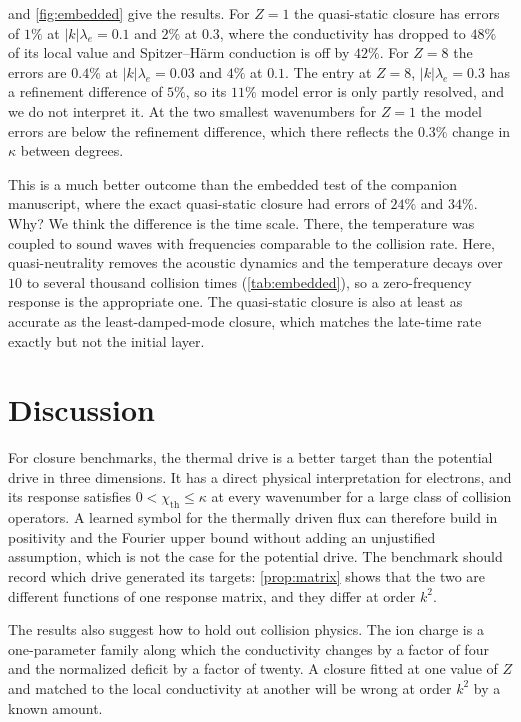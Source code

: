 \documentclass[11pt]{article}
\newcommand{\kap}{\kappa}
\newcommand{\thr}{\mathrm{th}}
\theoremstyle{definition}
\theoremstyle{remark}
\numberwithin{equation}{section}
\begin{document}
 and \cref{fig:embedded} give the results. For $Z=1$
the quasi-static closure has errors of $1\%$ at $|k|\lambda_e=0.1$ and
$2\%$ at $0.3$, where the conductivity has dropped to $48\%$ of its local
value and Spitzer--H\"arm conduction is off by $42\%$. For $Z=8$ the
errors are $0.4\%$ at $|k|\lambda_e=0.03$ and $4\%$ at $0.1$. The entry
at $Z=8$, $|k|\lambda_e=0.3$ has a refinement difference of $5\%$, so its
$11\%$ model error is only partly resolved, and we do not interpret it.
At the two smallest wavenumbers for $Z=1$ the model errors are below the
refinement difference, which there reflects the $0.3\%$ change in $\kap$
between degrees.

This is a much better outcome than the embedded test of the companion
manuscript, where the exact quasi-static closure had errors of $24\%$ and
$34\%$. Why? We think the difference is the time scale. There, the temperature
was coupled to sound waves with frequencies comparable to the collision
rate. Here, quasi-neutrality removes the acoustic dynamics and the
temperature decays over $10$ to several thousand collision times
(\cref{tab:embedded}), so a zero-frequency response is the appropriate
one. The quasi-static closure is also at least as accurate as the
least-damped-mode closure, which matches the late-time rate exactly but
not the initial layer.

\section{Discussion}\label{sec:discussion}

For closure benchmarks, the thermal drive is a better target than the
potential drive in three dimensions. It has a direct physical
interpretation for electrons, and its response satisfies
$0<\chi_\thr\leq\kap$ at every wavenumber for a large class of collision
operators. A learned symbol for the thermally driven flux can therefore
build in positivity and the Fourier upper bound without adding an
unjustified assumption, which is not the case for the potential drive.
The benchmark should record which drive generated its targets:
\cref{prop:matrix} shows that the two are different functions of one
response matrix, and they differ at order $k^2$.

The results also suggest how to hold out collision physics. The ion
charge is a one-parameter family along which the conductivity changes by
a factor of four and the normalized deficit by a factor of twenty. A
closure fitted at one value of $Z$ and matched to the local conductivity
at another will be wrong at order $k^2$ by a known amount.
\end{document}
